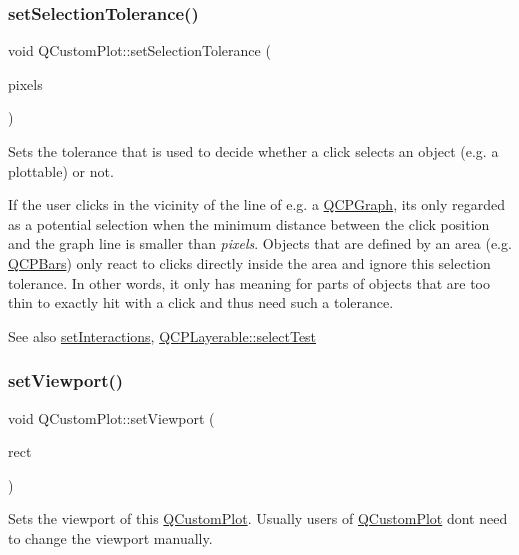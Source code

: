 \subsubsection{\texorpdfstring{set\+Selection\+Tolerance()}{setSelectionTolerance()}}
{\footnotesize\ttfamily void Q\+Custom\+Plot\+::set\+Selection\+Tolerance (\begin{DoxyParamCaption}\item[{int}]{pixels }\end{DoxyParamCaption})}

Sets the tolerance that is used to decide whether a click selects an object (e.\+g. a plottable) or not.

If the user clicks in the vicinity of the line of e.\+g. a \mbox{\hyperlink{class_q_c_p_graph}{Q\+C\+P\+Graph}}, it\textquotesingle{}s only regarded as a potential selection when the minimum distance between the click position and the graph line is smaller than {\itshape pixels}. Objects that are defined by an area (e.\+g. \mbox{\hyperlink{class_q_c_p_bars}{Q\+C\+P\+Bars}}) only react to clicks directly inside the area and ignore this selection tolerance. In other words, it only has meaning for parts of objects that are too thin to exactly hit with a click and thus need such a tolerance.

\begin{DoxySeeAlso}{See also}
\mbox{\hyperlink{class_q_custom_plot_a5ee1e2f6ae27419deca53e75907c27e5}{set\+Interactions}}, \mbox{\hyperlink{class_q_c_p_layerable_a04db8351fefd44cfdb77958e75c6288e}{Q\+C\+P\+Layerable\+::select\+Test}} 
\end{DoxySeeAlso}
\mbox{\label{class_q_custom_plot_a3f9bc4b939dd8aaba9339fd09f273fc4}} 
\subsubsection{\texorpdfstring{set\+Viewport()}{setViewport()}}
{\footnotesize\ttfamily void Q\+Custom\+Plot\+::set\+Viewport (\begin{DoxyParamCaption}\item[{const Q\+Rect \&}]{rect }\end{DoxyParamCaption})}

Sets the viewport of this \mbox{\hyperlink{class_q_custom_plot}{Q\+Custom\+Plot}}. Usually users of \mbox{\hyperlink{class_q_custom_plot}{Q\+Custom\+Plot}} don\textquotesingle{}t need to change the viewport manually.

